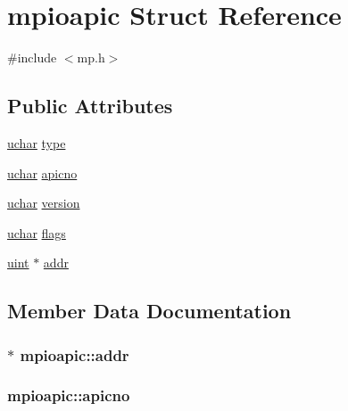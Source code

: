 \hypertarget{structmpioapic}{}\section{mpioapic Struct Reference}
\label{structmpioapic}


{\ttfamily \#include $<$mp.\+h$>$}

\subsection*{Public Attributes}
\begin{DoxyCompactItemize}
\item 
\hyperlink{custom__types_8h_a65f85814a8290f9797005d3b28e7e5fc}{uchar} \hyperlink{structmpioapic_a8d7527bad798d6f8a59a21df06879f0f}{type}
\item 
\hyperlink{custom__types_8h_a65f85814a8290f9797005d3b28e7e5fc}{uchar} \hyperlink{structmpioapic_a9a975b41f6af43937d67c3b63235dd7d}{apicno}
\item 
\hyperlink{custom__types_8h_a65f85814a8290f9797005d3b28e7e5fc}{uchar} \hyperlink{structmpioapic_a7c6f3d950f89e2b982fd53f7c59681e7}{version}
\item 
\hyperlink{custom__types_8h_a65f85814a8290f9797005d3b28e7e5fc}{uchar} \hyperlink{structmpioapic_a9cc0f4c76312b7d074c558cbcad38a12}{flags}
\item 
\hyperlink{custom__types_8h_a91ad9478d81a7aaf2593e8d9c3d06a14}{uint} $\ast$ \hyperlink{structmpioapic_a364bbba1df7846f9c6d271c7c85a7aaa}{addr}
\end{DoxyCompactItemize}


\subsection{Member Data Documentation}
\subsubsection[{\texorpdfstring{addr}{addr}}]{$\ast$ mpioapic\+::addr}\hypertarget{structmpioapic_a364bbba1df7846f9c6d271c7c85a7aaa}{}\label{structmpioapic_a364bbba1df7846f9c6d271c7c85a7aaa}
\subsubsection[{\texorpdfstring{apicno}{apicno}}]{ mpioapic\+::apicno}\hypertarget{structmpioapic_a9a975b41f6af43937d67c3b63235dd7d}{}\label{structmpioapic_a9a975b41f6af43937d67c3b63235dd7d}
